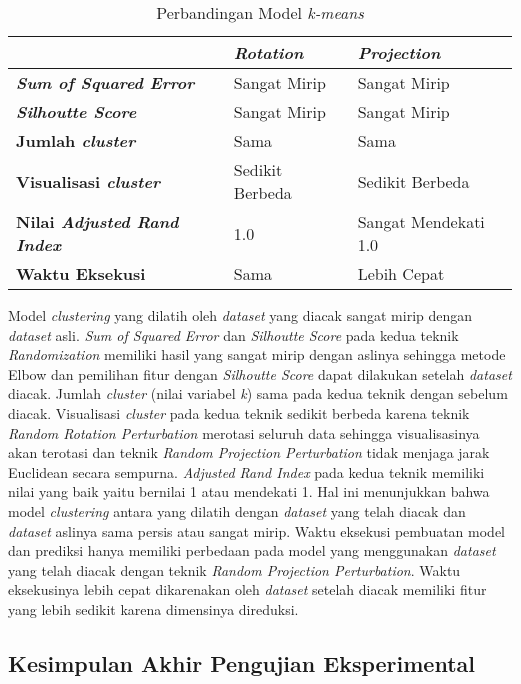 \begin{table}
	\centering
	\caption{Perbandingan Model \textit{k-means}}
	\begin{tabular}{|l|l|l|}
		\hline
		& \textbf{\textit{Rotation}} & \textbf{\textit{Projection}} \\ \hline
		\textbf{\textit{Sum of Squared Error}} & Sangat Mirip & Sangat Mirip \\
		\textbf{\textit{Silhoutte Score}} & Sangat Mirip & Sangat Mirip \\
		\textbf{Jumlah \textit{cluster}} & Sama & Sama \\
		\textbf{Visualisasi \textit{cluster}} & Sedikit Berbeda & Sedikit Berbeda \\
		\textbf{Nilai \textit{Adjusted Rand Index}} & 1.0 & Sangat Mendekati 1.0 \\
		\textbf{Waktu Eksekusi} & Sama & Lebih Cepat \\
		\hline
	\end{tabular}
	\label{table:perbandingan-clustering}
\end{table}

Model \textit{clustering} yang dilatih oleh \textit{dataset} yang diacak sangat mirip dengan \textit{dataset} asli. \textit{Sum of Squared Error} dan \textit{Silhoutte Score} pada kedua teknik \textit{Randomization} memiliki hasil yang sangat mirip dengan aslinya sehingga metode Elbow dan pemilihan fitur dengan \textit{Silhoutte Score} dapat dilakukan setelah \textit{dataset} diacak. Jumlah \textit{cluster} (nilai variabel \textit{k}) sama pada kedua teknik dengan sebelum diacak. Visualisasi \textit{cluster} pada kedua teknik sedikit berbeda karena teknik \textit{Random Rotation Perturbation} merotasi seluruh data sehingga visualisasinya akan terotasi dan teknik \textit{Random Projection Perturbation} tidak menjaga jarak Euclidean secara sempurna. \textit{Adjusted Rand Index} pada kedua teknik memiliki nilai yang baik yaitu bernilai 1 atau mendekati 1. Hal ini menunjukkan bahwa model \textit{clustering} antara yang dilatih dengan \textit{dataset} yang telah diacak dan \textit{dataset} aslinya sama persis atau sangat mirip. Waktu eksekusi pembuatan model dan prediksi hanya memiliki perbedaan pada model yang menggunakan \textit{dataset} yang telah diacak dengan teknik \textit{Random Projection Perturbation}. Waktu eksekusinya lebih cepat dikarenakan oleh \textit{dataset} setelah diacak memiliki fitur yang lebih sedikit karena dimensinya direduksi.

\subsection{Kesimpulan Akhir Pengujian Eksperimental}
\label{subsec:kesimpulan-eksperimental}

